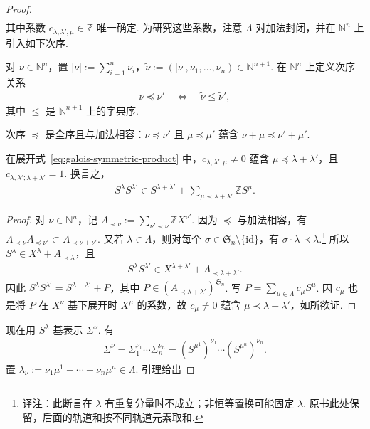 \begin{proof}
\begin{align*}
\end{align*}
其中系数 $c_{\lambda,\lambda';\mu}\in\mathbb Z$ 唯一确定. 为研究这些系数，注意 $\Lambda$ 对加法封闭，并在 $\mathbb N^n$ 上引入如下次序.
\begin{definition*}对 $\nu\in\mathbb N^n$，置 $|\nu|:=\sum_{i=1}^n\nu_i$，$\widetilde\nu:=(|\nu|,\nu_1,\ldots,\nu_n)\in\mathbb N^{n+1}$. 在 $\mathbb N^n$ 上定义次序关系
\begin{align*}
\nu\preccurlyeq\nu'\quad\Longleftrightarrow\quad\widetilde\nu\leq\widetilde\nu',
\end{align*}
其中 $\leq$ 是 $\mathbb N^{n+1}$ 上的字典序.\end{definition*}
次序 $\preccurlyeq$ 是全序且与加法相容：$\nu\preccurlyeq\nu'$ 且 $\mu\preccurlyeq\mu'$ 蕴含 $\nu+\mu\preccurlyeq\nu'+\mu'$.
\begin{lemma*}在展开式~\eqref{eq:galois-symmetric-product} 中，$c_{\lambda,\lambda';\mu}\ne0$ 蕴含 $\mu\preccurlyeq\lambda+\lambda'$，且 $c_{\lambda,\lambda';\lambda+\lambda'}=1$. 换言之，
\begin{align*}
S^\lambda S^{\lambda'}\in S^{\lambda+\lambda'}+\sum_{\mu\prec\lambda+\lambda'}\mathbb Z S^\mu.
\end{align*}\end{lemma*}
\begin{proof}对 $\nu\in\mathbb N^n$，记 $A_{\prec\nu}:=\sum_{\nu'\prec\nu}\mathbb ZX^{\nu'}$. 因为 $\preccurlyeq$ 与加法相容，有 $A_{\prec\nu}A_{\preccurlyeq\nu'}\subset A_{\prec\nu+\nu'}$. 又若 $\lambda\in\Lambda$，则对每个 $\sigma\in\mathfrak S_n\setminus\{\mathrm{id}\}$，有 $\sigma\cdot\lambda\prec\lambda$.\footnote{译注：此断言在 $\lambda$ 有重复分量时不成立；非恒等置换可能固定 $\lambda$. 原书此处保留，后面的轨道和按不同轨道元素取和.} 所以 $S^\lambda\in X^\lambda+A_{\prec\lambda}$，且
\begin{align*}
S^\lambda S^{\lambda'}\in X^{\lambda+\lambda'}+A_{\prec\lambda+\lambda'}.
\end{align*}
因此 $S^\lambda S^{\lambda'}=S^{\lambda+\lambda'}+P$，其中 $P\in(A_{\prec\lambda+\lambda'})^{\mathfrak S_n}$. 写 $P=\sum_{\mu\in\Lambda}c_\mu S^\mu$. 因 $c_\mu$ 也是将 $P$ 在 $X^\nu$ 基下展开时 $X^\mu$ 的系数，故 $c_\mu\ne0$ 蕴含 $\mu\prec\lambda+\lambda'$，如所欲证.\end{proof}
现在用 $S^\lambda$ 基表示 $\Sigma^\nu$. 有
\begin{align*}
\Sigma^\nu=\Sigma_1^{\nu_1}\cdots\Sigma_n^{\nu_n}=(S^{\mu^1})^{\nu_1}\cdots(S^{\mu^n})^{\nu_n}.
\end{align*}
置 $\lambda_\nu:=\nu_1\mu^1+\cdots+\nu_n\mu^n\in\Lambda$. 引理给出

\end{proof}
